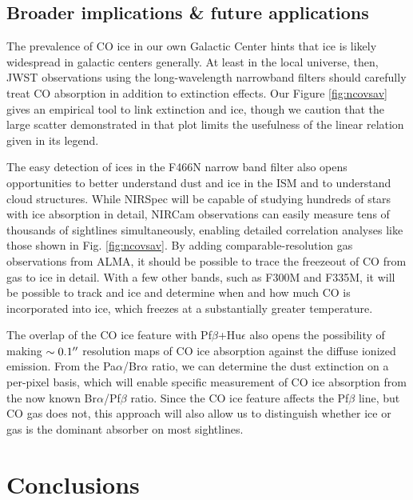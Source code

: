 \documentclass[times,astrosymb,twocolumn]{aastex631}
\newcommand\hue{Hu\ensuremath{\epsilon}\xspace}
\def\rr#1{#1}
\begin{document}
\subsection{Broader implications \& future applications}
The prevalence of CO ice in our own Galactic Center hints that ice is likely widespread in galactic centers generally.
At least in the local universe, then, \rr{JWST} observations using the long-wavelength narrowband filters should carefully treat CO absorption in addition to extinction effects.
Our Figure \ref{fig:ncovsav} gives a\rr{n} empirical tool to link extinction and ice, though we caution that the large scatter demonstrated in that plot limits the usefulness of the linear relation given in its legend.

The easy detection of ices in \rr{the F466N} narrow band filter also opens opportunities to better understand dust and ice in the ISM and to understand cloud structures.
While NIRSpec will be capable of studying hundreds of stars with ice absorption in detail, NIRCam observations can easily measure tens of thousands of sightlines simultaneously, enabling detailed correlation analyses like those shown in Fig. \ref{fig:ncovsav}.
By adding comparable-resolution gas observations from ALMA, it should be possible to trace the freezeout of CO from gas to ice in detail.
With a few other bands, such as F300M and F335M, it will be possible to track \water and \methanol ice and determine when and how much CO is incorporated into \water ice, which freezes at a substantially \rr{greater} temperature.

The overlap of the CO ice feature with Pf$\beta$+\hue also opens the possibility of making $\sim0.1\mbox{$^{\prime\prime}$}$ resolution maps of CO ice absorption \rr{against the diffuse ionized emission}.
From the Pa$\alpha$/Br$\alpha$ ratio, we can determine the dust extinction on a per-pixel basis, which will enable specific measurement of CO ice absorption from the \rr{now known} Br$\alpha$/Pf$\beta$ ratio.
Since the CO ice feature affects the Pf$\beta$ line, but CO gas does not, this approach will also allow us to distinguish whether ice or gas is the dominant absorber on most sightlines.


\section{Conclusions}
\label{sec:conclusion}
\end{document}
